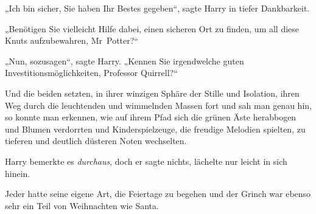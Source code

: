 „Ich bin sicher, Sie haben Ihr Bestes gegeben“, sagte Harry in tiefer Dankbarkeit.

„Benötigen Sie vielleicht Hilfe dabei, einen sicheren Ort zu finden, um all diese Knuts aufzubewahren, Mr~Potter?“

„Nun, sozusagen“, sagte Harry. „Kennen Sie irgendwelche guten Investitionsmöglichkeiten, Professor Quirrell?“

Und die beiden setzten, in ihrer winzigen Sphäre der Stille und Isolation, ihren Weg durch die leuchtenden und wimmelnden Massen fort und sah man genau hin, so konnte man erkennen, wie auf ihrem Pfad sich die grünen Äste herabbogen und Blumen verdorrten und Kinderspielzeuge, die freudige Melodien spielten, zu tieferen und deutlich düsteren Noten wechselten.

Harry bemerkte es \emph{durchaus}, doch er sagte nichts, lächelte nur leicht in sich hinein.

Jeder hatte seine eigene Art, die Feiertage zu begehen und der Grinch war ebenso sehr ein Teil von Weihnachten wie Santa.

